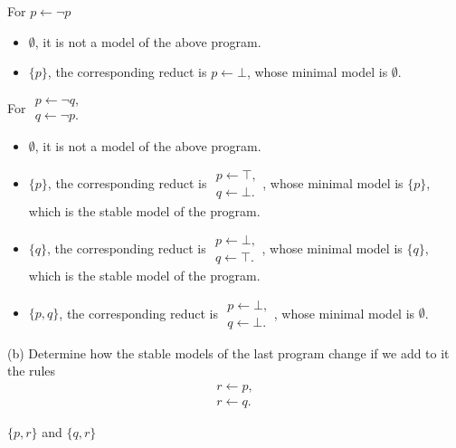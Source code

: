 \begin{enumerate}
For \qquad $p \leftarrow \neg p$
\begin{itemize}
\item $\emptyset$, it is not a model of the above program. 
\item $\{p\}$, the corresponding reduct is $p \leftarrow \bot$, whose minimal model is $\emptyset$.
\end{itemize}

For \qquad $\begin{gathered}
p \leftarrow \neg q, \\
q \leftarrow \neg p. 
\end{gathered}$
 
\begin{itemize}
\item $\emptyset$, it is not a model of the above program. 
\item $\{p\}$, 
the corresponding reduct is 
$\begin{gathered}
p \leftarrow \top, \\
q \leftarrow \bot. 
\end{gathered}$, 
whose minimal model is $\{p\}$, which is the stable model of the program. 
\item $\{q\}$, 
the corresponding reduct is 
$\begin{gathered}
p \leftarrow \bot, \\
q \leftarrow \top. 
\end{gathered}$, 
whose minimal model is $\{q\}$, which is the stable model of the program. 
\item $\{p, q\}$, 
the corresponding reduct is 
$\begin{gathered}
p \leftarrow \bot, \\
q \leftarrow \bot. 
\end{gathered}$, 
whose minimal model is $\emptyset$. 
\end{itemize}

(b) Determine how the stable models of the last program change if we add to it the rules
\begin{gather*}
r \leftarrow p, \\
r \leftarrow q. 
\end{gather*}
\begin{center}
$\{p, r\}$ and $\{q, r\}$
\end{center}

\newpage


\end{enumerate}
